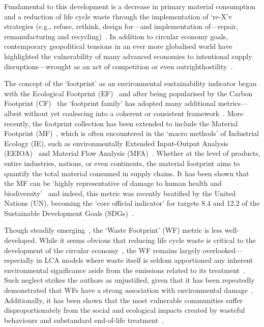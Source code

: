 \documentclass[a4paper,fleqn]{cas-dc}
\begin{document}
Fundamental to this development is a decrease in primary material consumption and a reduction of life cycle waste through the implementation of  `re-X'v strategies (e.g., refuse, rethink, design for---and implementation of---repair, remanufacturing and recycling)~\citep{reike2018rex, eu2022ecodesign, eu2022repair, eu2015reman}. In addition to circular economy goals, contemporary  geopolitical tensions in an ever more globalised  world have highlighted the vulnerability of many advanced economies to intentional supply disruptions---wrought as an act of competition or even  outrighthostility~\citep{jrc2023supplychain,hartley2024cepolitics,berry2023crm}.

The concept of the `footprint' as an environmental sustainability indicator began with the Ecological Footprint (EF)~\citep{wackernagel1994ecologicalfootprint} and after being popularised by the Carbon Footprint (CF)~\citep{cucek2015environmentalfootprints} the `footprint family' has adopted many additional metrics---albeit without yet
coalescing into a coherent or consistent  framework~\citep{giampietro2014footprintstonowhere,vanham2019footprints,ridoutt2013footprints}. More recently, the footprint
collection has been extended to include the Material Footprint (MF)~\citep{weidmann2013materialfootprint}, which is often encountered in the
`macro methods' of Industrial Ecology (IE), such as environmentally Extended Input-Output Analysis (EEIOA)~\citep{lenzen2022materialfootprint} and Material
Flow Analysis (MFA)~\citep{schaffartzik2013mfafootprint}. Whether at the level of products, entire industries,  nations, or even continents, the material
footprint aims to quantify the total material consumed in supply chains. It has been shown that the MF can be `highly representative of damage to human health
and biodiversity'~\citep{steinmann2017resourcefootprints} and indeed, this metric was recently beatified by the United Nations (UN), becoming the `core
official indicator' for targets 8.4 and 12.2 of the Sustainable Development Goals (SDGs)~\citep{lenzen2022materialfootprint}.

Though steadily emerging~\citep{laurenti2016wastefootprint,demirer2019wastefootprint,guillotreau2023wastefootprint}, the  `Waste Footprint' (WF)  metric is less well-developed. While it seems obvious that reducing life cycle waste is critical to the development of the circular economy~\citep{towa2020wastefootprint,ellenmacarthur2015ce}, the WF remains largely overlooked---especially in LCA models where waste itself is seldom apportioned any inherent environmental significance aside from the emissions related to its treatment~\citep{laurenti2023wastefootprint}. Such  neglect strikes the authors as unjustified, given that it has been repeatedly demonstrated that WFs have a strong association with environmental damage~\citep{laurenti2023wastefootprint,doka2024publications, ridoutt2010wasteimpacts,jaio2013wasteabsorbtionfootprint}. Additionally, it has been shown that the most vulnerable communities suffer disproportionately from the social and ecological impacts created by wasteful behaviours and  substandard end-of-life treatment~\citep{pellow2023envjusticewaste,akese2018envjustice}.
\end{document}
